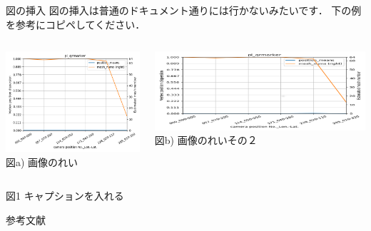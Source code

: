 \documentclass[dvipdfmx]{beamer}
\begin{document}
  \begin{frame}{図の挿入}
      図の挿入は普通のドキュメント通りには行かないみたいです．
      下の例を参考にコピペしてください．
     \begin{block}{}
         \centering
        \begin{columns}[onlytextwidth]
            \begin{column}[T]{0.49\textwidth} %
                \centering
                \includegraphics[width=1.0\linewidth]{img/fig.png}
                図a) 画像のれい
            \end{column}
            \begin{column}[T]{0.49\textwidth} %
                \centering
                \includegraphics[width=1.0\linewidth]{img/fig-buchi.png}
                図b) 画像のれいその２
            \end{column}
        \end{columns}
        図1 キャプションを入れる
     \end{block}
  \end{frame}
  \begin{frame}{参考文献}
    
\end{frame}
\end{document}
